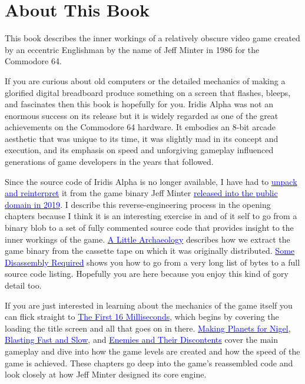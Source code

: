 \chapter*{About This Book} 
This book describes the inner workings of a relatively obscure video game created
by an eccentric Englishman by the name of Jeff Minter in 1986 for the Commodore 64.

If you are curious about old computers or the detailed mechanics
of making a glorified digital breadboard produce something on a screen that flashes, bleeps,
and fascinates then this book is hopefully for you. Iridis Alpha was not an enormous success on its release
but it is widely regarded as one of the great achievements on the Commodore 64 hardware. It embodies an 8-bit arcade aesthetic that was
unique to its time, it was slightly mad in its concept and execution, and its emphasis on speed and unforgiving gameplay influenced
generations of game developers in the years that followed.

Since the source code of Iridis Alpha is no longer available, I have had to \href{https://github.com/mwenge/iridisalpha}{\textcolor{blue}{unpack and reinterpret}} it
from the game binary Jeff Minter \href{https://www.llamasoftarchive.org/oldsite/llamasoft/cbm64/IridisAlpha.zip}{\textcolor{blue}{released into the public domain in 2019}}. I describe this
reverse-engineering process in the opening chapters because I think it is an interesting exercise in and of it self to go from
a binary blob to a set of fully commented source code that provides insight to the inner workings of the game. 
\hyperref[sec:archaeo]{\textcolor{blue}{A Little Archaeology}} describes how we extract the game binary from the cassette
tape on which it was originally distributed. \hyperref[sec:disassembly]{\textcolor{blue}{Some Disassembly Required}} shows you how to go from 
a very long list of bytes to a full source code listing. Hopefully you are here because you enjoy this kind of gory detail too.

If you are just interested in learning about the mechanics of the game itself you can flick straight to \hyperref[sec:first16]{\textcolor{blue}{The First 16 Milliseconds}}, 
which begins by covering the loading the title screen and all that goes on in there. \hyperref[sec:planets]{\textcolor{blue}{Making Planets for Nigel}},
\hyperref[sec:blast]{\textcolor{blue}{Blasting Fast and Slow}}, and \hyperref[sec:level]{\textcolor{blue}{Enemies and Their Discontents}} cover the main gameplay
and dive into how the game levels are created and how the speed of the game is achieved. These chapters go deep into the game's reassembled code and look closely at how
Jeff Minter designed its core engine.

